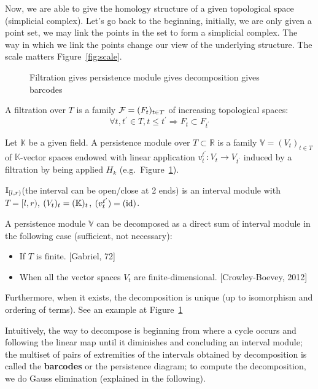 Now, we are able to give the homology structure of a given topological space (simplicial complex).
Let's go back to the beginning, initially, we are only given a point set,
we may link the points in the set to form a simplicial complex.
The way in which we link the points change our view of the underlying structure.
The scale matters Figure~\ref{fig:scale}.

\begin{figure}[H]
  \centering
  
  \caption{Filtration gives persistence module gives decomposition gives barcodes}
  \label{fig:tda_diagram}
\end{figure}

\begin{definition}[Filtration]
  A filtration over $T$ is a family $\mathcal{F} = (F_t)_{t\in T}$ of increasing topological spaces:
  $$
  \forall t, t^{\prime} \in T, t \leqslant t^{\prime} \Rightarrow F_t \subset F_{t^{\prime}}
  $$
\end{definition}

\begin{definition}
  Let $\mathbb{K}$ be a given field. A persistence module over $T \subset \mathbb{R}$ is a family $\mathbb{V}=\left(V_t\right)_{t \in T}$ of $\mathbb{K}$-vector spaces
  endowed with linear application $v_t^{t^{\prime}}: V_t \rightarrow V_{t^{\prime}}$ induced by
  a filtration by being applied $H_k$ (e.g.\ Figure~\ref{fig:tda_diagram}).

  $\mathbb{I}_{[l, r)}$(the interval can be open/close at 2 ends) is an interval module with $T = [l, r)$,
  $(V_t)_t = (\mathbb{K})_t$, $(v^{t'}_t) = (\operatorname{id})$.
\end{definition}

\begin{theorem}
  A persistence module $\mathbb{V}$ can be decomposed as a direct sum of interval module
  in the following case (sufficient, not necessary):
  \begin{itemize}
    \item If $T$ is finite. [Gabriel, 72]
    \item When all the vector spaces $V_t$ are finite-dimensional. [Crowley-Boevey, 2012]
  \end{itemize}
  Furthermore, when it exists, the decomposition is unique (up to isomorphism and ordering of terms).
  See an example at Figure~\ref{fig:tda_diagram}
\end{theorem}

\RM Intuitively, the way to decompose is beginning from where a cycle occurs
and following the linear map until it diminishes and concluding an interval module;
the multiset of pairs of extremities of the intervals obtained by decomposition is called the \textbf{barcodes}
or the persistence diagram; to compute the decomposition, we do Gauss elimination (explained in the following).

